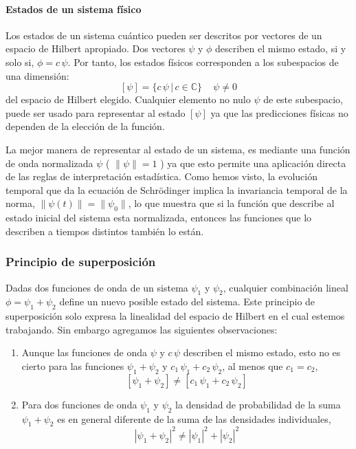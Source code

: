\documentclass[12pt]{book}
\numberwithin{equation}{chapter}
\def\C{\mathbb{C}}
\begin{document}
\paragraph{Estados de un sistema f\'isico} Los estados de un sistema cu\'antico pueden ser descritos por vectores de un espacio de Hilbert apropiado. Dos vectores $\psi$ y $\phi$ describen el mismo estado, si y solo si, $\phi = c\, \psi$. Por tanto, los estados f\'isicos corresponden a los subespacios de una dimensi\'on:
\begin{equation}\label{est-1d}
[\psi]= \{ c \, \psi \,|\, c \in \C \} \,\,\,\,\,\,\, \psi \neq 0
\end{equation} 
del espacio de Hilbert elegido. Cualquier elemento no nulo $\psi$ de este subespacio, puede ser usado para representar al estado $[\psi]$ ya que las predicciones f\'isicas no dependen de la elecci\'on de la funci\'on.  
\rightline{$\dag$}
\vspace{3 mm} 

La mejor manera de representar al estado de un sistema, es mediante una funci\'on de onda normalizada $\psi$ ( $\| \psi \|=1$ ) ya que esto permite una aplicaci\'on directa de las reglas de interpretaci\'on estad\'istica. Como hemos visto, la evoluci\'on temporal que da la ecuaci\'on de Schr\"odinger implica la invariancia temporal de la norma, $\|\psi(t)\|= \|\psi_{0}\|$, lo que muestra que si la funci\'on que describe al estado inicial del sistema esta normalizada, entonces las funciones que lo describen a tiempos distintos tambi\'en lo est\'an.  

\subsubsection{Principio de superposici\'on}
Dadas dos funciones de onda de un sistema $\psi_{1}$ y $\psi_{2}$, cualquier combinaci\'on lineal $\phi = \psi_{1} + \psi_{2}$ define un nuevo posible estado del sistema. Este principio de superposici\'on solo expresa la linealidad del espacio de Hilbert en el cual estemos trabajando. Sin embargo agregamos las siguientes observaciones:
\begin{enumerate}
\item Aunque las funciones de onda $\psi$ y $c \, \psi$ describen el mismo estado, esto no es cierto para las funciones $ \psi_{1}+\psi_{2} $ y $c_{1} \, \psi_{1}+c_{2}\, \psi_{2}$, al menos que $c_{1}= c_{2}$,
$$ [\psi_{1}+\psi_{2}] \neq [c_{1} \, \psi_{1}+c_{2}\, \psi_{2}] $$

\item Para dos funciones de onda $\psi_{1}$ y $\psi_{2}$ la densidad de probabilidad de la suma $\psi_{1}+\psi_{2}$ es en general diferente de la suma de las densidades individuales,
$$ |\psi_{1}+\psi_{2}|^{2} \neq |\psi_{1}|^{2} + |\psi_{2}|^{2} $$
\end{enumerate}
\end{document}
